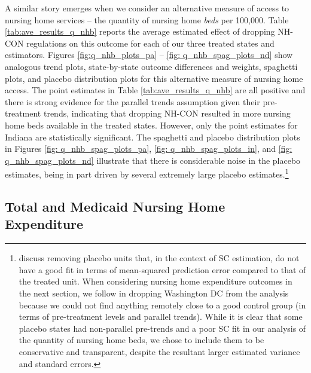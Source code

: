 \documentclass[../Main.tex]{subfiles}
\begin{document}
\indent A similar story emerges when we consider an alternative measure of access to nursing home services -- the quantity of nursing home \textit{beds} per 100,000. Table \ref{tab:ave_results_q_nhb} reports the average estimated effect of dropping NH-CON regulations on this outcome for each of our three treated states and estimators. Figures \ref{fig:q_nhb_plots_pa} -- \ref{fig: q_nhb_spag_plots_nd} show analogous trend plots, state-by-state outcome differences and weights, spaghetti plots, and placebo distribution plots for this alternative measure of nursing home access. The point estimates in Table \ref{tab:ave_results_q_nhb} are all positive and there is strong evidence for the parallel trends assumption given their pre-treatment trends, indicating that dropping NH-CON resulted in more nursing home beds available in the treated states. However, only the point estimates for Indiana are statistically significant. The spaghetti and placebo distribution plots in Figures \ref{fig: q_nhb_spag_plots_pa}, \ref{fig: q_nhb_spag_plots_in}, and \ref{fig: q_nhb_spag_plots_nd} illustrate that there is considerable noise in the placebo estimates, being in part driven by several extremely large placebo estimates.\footnote{\citet{abadie2010synthetic} discuss removing placebo units that, in the context of SC estimation, do not have a good fit in terms of mean-squared prediction error compared to that of the treated unit. When considering nursing home expenditure outcomes in the next section, we follow \citet{abadie2010synthetic} in dropping Washington DC from the analysis because we could not find anything remotely close to a good control group (in terms of pre-treatment levels and parallel trends). While it is clear that some placebo states had non-parallel pre-trends and a poor SC fit in our analysis of the quantity of nursing home beds, we chose to include them to be conservative and transparent, despite the resultant larger estimated variance and standard errors.}

\subsection{Total and Medicaid Nursing Home Expenditure}
\end{document}
